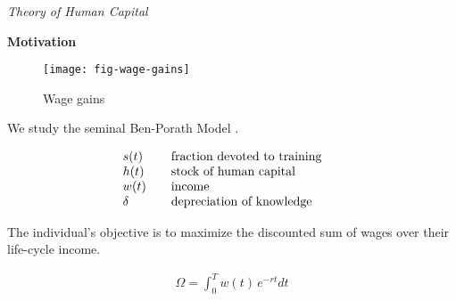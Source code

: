 \begin{frame}\begin{center}
		\LARGE\textit{Theory of Human Capital}
\end{center}\end{frame}
\begin{frame}\textbf{Motivation}\vspace{0.3cm}
	\begin{figure}[htp]\centering
		\caption{Wage gains}\scalebox{0.35}
		{\texttt{[image: fig-wage-gains]}}
	\end{figure}
\end{frame}
\begin{frame}
We study the seminal Ben-Porath Model \cite{Ben-Porath.1967}.

\begin{align*}\begin{array}{l@{\qquad}l@{\qquad}l}
s(t) 	& \text{fraction devoted to training} \\
h(t)    & \text{stock of human capital} \\
w(t)	& \text{income} \\
\delta  & \text{depreciation of knowledge}
\end{array}\end{align*}
\end{frame}
\begin{frame}
The individual's objective is to maximize the discounted sum of wages over their life-cycle income.

\begin{align*}
\Omega = \int^T_0 w(t)\, e^{-r t} dt
\end{align*}
\end{frame}

